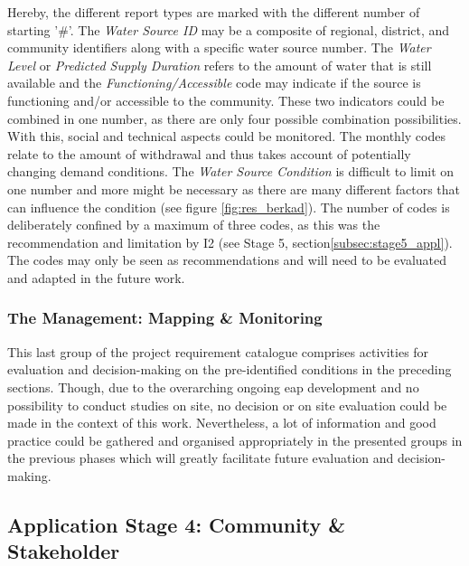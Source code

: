 Hereby, the different report types are marked with the different number of starting '\#'. The \textit{Water Source ID} may be a composite of regional, district, and community identifiers along with a specific water source number. The \textit{Water Level} or \textit{Predicted Supply Duration} refers to the amount of water that is still available and the \textit{Functioning/Accessible} code may indicate if the source is functioning and/or accessible to the community. These two indicators could be combined in one number, as there are only four possible combination possibilities. With this, social and technical aspects could be monitored. The monthly codes relate to the amount of withdrawal and thus takes account of potentially changing demand conditions. The \textit{Water Source Condition} is difficult to limit on one number and more might be necessary as there are many different factors that can influence the condition (see figure \ref{fig:res_berkad}). The number of codes is deliberately confined by a maximum of three codes, as this was the recommendation and limitation by I2 (see Stage 5, section\ref{subsec:stage5_appl}). The codes may only be seen as recommendations and will need to be evaluated and adapted in the future work.

\subsubsection{The Management: Mapping \& Monitoring}

This last group of the project requirement catalogue comprises activities for evaluation and decision-making on the pre-identified conditions in the preceding sections. Though, due to the overarching ongoing \acrshort{eap} development and no possibility to conduct studies on site, no decision or on site evaluation could be made in the context of this work. Nevertheless, a lot of information and good practice could be gathered and organised appropriately in the presented groups in the previous phases which will greatly facilitate future evaluation and decision-making.\newline

\subsection{Application Stage 4: Community \& Stakeholder}\label{subsec:stage4_appl} 

